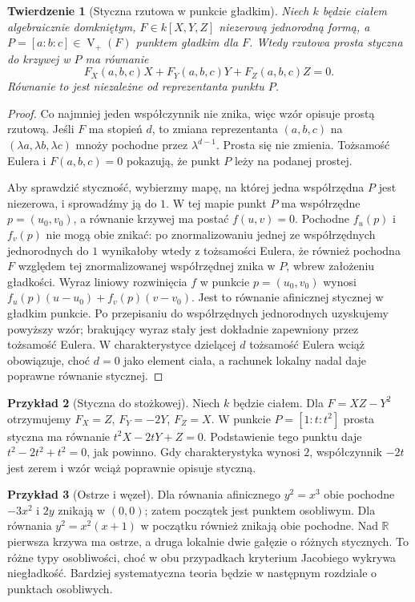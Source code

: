 \documentclass[11pt,a4paper,openany]{report}
\numberwithin{equation}{section}
\theoremstyle{plain}
\newtheorem{twierdzenie}{Twierdzenie}[section]
\theoremstyle{definition}
\newtheorem{przyklad}[twierdzenie]{Przykład}
\theoremstyle{remark}
\newcommand{\R}{\mathbb R}
\newcommand{\V}{\operatorname V}
\begin{document}
\begin{twierdzenie}[Styczna rzutowa w punkcie gładkim]
\label{tw:tangent-projective}
Niech $k$ będzie ciałem algebraicznie domkniętym,
$F\in k[X,Y,Z]$ niezerową jednorodną formą,
a $P=[a:b:c]\in\V_+(F)$ punktem gładkim dla $F$.
Wtedy rzutowa prosta styczna do krzywej w $P$ ma równanie
\[
 F_X(a,b,c)X+F_Y(a,b,c)Y+F_Z(a,b,c)Z=0.
\]
Równanie to jest niezależne od reprezentanta punktu $P$.
\end{twierdzenie}
\begin{proof}
Co najmniej jeden współczynnik nie znika, więc wzór
opisuje prostą rzutową. Jeśli $F$ ma stopień $d$,
to zmiana reprezentanta $(a,b,c)$ na
$(\lambda a,\lambda b,\lambda c)$ mnoży pochodne
przez $\lambda^{d-1}$. Prosta się nie zmienia.
Tożsamość Eulera i $F(a,b,c)=0$ pokazują,
że punkt $P$ leży na podanej prostej.

Aby sprawdzić styczność, wybierzmy mapę, na której jedna
współrzędna $P$ jest niezerowa, i sprowadźmy ją do $1$.
W tej mapie punkt $P$ ma współrzędne $p=(u_0,v_0)$,
a równanie krzywej ma postać $f(u,v)=0$.
Pochodne $f_u(p)$ i $f_v(p)$ nie mogą obie znikać:
po znormalizowaniu jednej ze współrzędnych jednorodnych do $1$
wynikałoby wtedy z tożsamości Eulera, że również pochodna $F$
względem tej znormalizowanej współrzędnej znika w $P$,
wbrew założeniu gładkości.
Wyraz liniowy rozwinięcia $f$ w punkcie $p=(u_0,v_0)$
wynosi $f_u(p)(u-u_0)+f_v(p)(v-v_0)$.
Jest to równanie afinicznej stycznej w gładkim punkcie.
Po przepisaniu do współrzędnych jednorodnych uzyskujemy
powyższy wzór; brakujący wyraz stały jest dokładnie
zapewniony przez tożsamość Eulera. W charakterystyce
dzielącej $d$ tożsamość Eulera wciąż obowiązuje,
choć $d=0$ jako element ciała, a rachunek lokalny
nadal daje poprawne równanie stycznej.
\end{proof}

\begin{przyklad}[Styczna do stożkowej]
Niech $k$ będzie ciałem. Dla $F=XZ-Y^2$ otrzymujemy $F_X=Z$, $F_Y=-2Y$,
$F_Z=X$. W punkcie $P=[1:t:t^2]$ prosta styczna ma
równanie $t^2X-2tY+Z=0$. Podstawienie tego punktu daje
$t^2-2t^2+t^2=0$, jak powinno. Gdy charakterystyka
wynosi $2$, współczynnik $-2t$ jest zerem i wzór
wciąż poprawnie opisuje styczną.
\end{przyklad}

\begin{przyklad}[Ostrze i węzeł]
Dla równania afinicznego $y^2=x^3$ obie pochodne
$-3x^2$ i $2y$ znikają w $(0,0)$; zatem początek
jest punktem osobliwym. Dla równania
$y^2=x^2(x+1)$ w początku również znikają obie pochodne.
Nad $\R$ pierwsza krzywa ma ostrze, a druga lokalnie
dwie gałęzie o różnych stycznych. To różne typy osobliwości,
choć w obu przypadkach kryterium Jacobiego wykrywa
niegładkość. Bardziej systematyczna teoria będzie
w następnym rozdziale o punktach osobliwych.
\end{przyklad}
\end{document}
